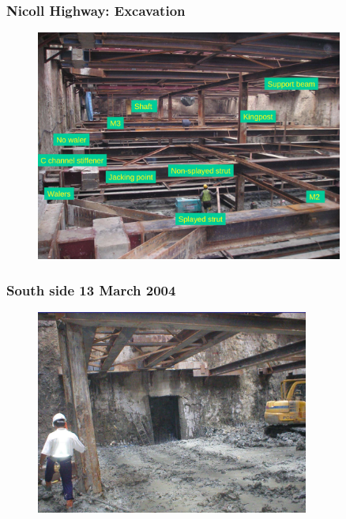 \documentclass[notes]{beamer}
\begin{document}
%

\begin{frame}
\frametitle{Nicoll Highway: Excavation}
\begin{figure}[ht]
	\centering
	\includegraphics[width=0.9\textwidth]{figs/nicoll-highway-structures.png}
\end{figure}
\end{frame}

\begin{frame}
\frametitle{South side 13 March 2004}
\begin{figure}[ht]
	\centering
	\includegraphics[width=0.8\textwidth]{figs/south-side-14march04.png}
\end{figure}
\end{frame}
\end{document}

